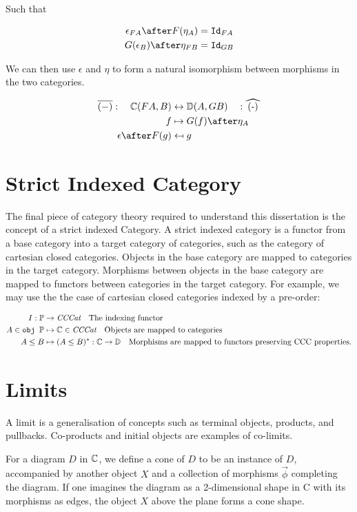 \documentclass{Report}
\begin{document}
Such that 

\begin{align}
    \epsilon_{F A}\after F(\eta_A) & = \Id{F A} \\
    G(\epsilon_B)\after \eta_{F B} & = \Id{G B}
\end{align}

We can then use $\epsilon$ and $\eta$ to form a natural isomorphism between morphisms in the two categories.

\begin{align}
    \bar{(-)}: \quad\C(FA, B) &\leftrightarrow \DC(A, GB) \quad: \widehat{(-)}\\
     f & \mapsto G(f)\after\eta_A \\
     \epsilon\after F(g) & \mapsfrom g\\
\end{align}

\section{Strict Indexed Category}
The final piece of category theory required to understand this dissertation is the concept of a strict indexed Category. A strict indexed category is a functor from a base category into a target category of categories, such as the category of cartesian closed categories. Objects in the base category are mapped to categories in the target category. Morphisms between objects in the base category are mapped to functors between categories in the target category. For example, we may use the the case of cartesian closed categories indexed by a pre-order:

\begin{align}
    I: \mathbb{P} & \rightarrow \textit{CCCat}\quad\text{The indexing functor} \\
    A \in\texttt{obj }\mathbb{P} & \mapsto \mathbb{C} \in\textit{CCCat}\quad\text{Objects are mapped to categories}\\
    A \leq B & \mapsto (A \leq B)^*: \mathbb{C} \rightarrow \mathbb{D}\quad\text{Morphisms are mapped to functors preserving CCC properties.}
\end{align}

\section{Limits}
A limit is a generalisation of concepts such as terminal objects, products, and pullbacks. Co-products and initial objects are examples of co-limits.


For a diagram $D$ in $\mathbb{C}$, we define a cone of $D$ to be an instance of $D$, accompanied by another object $X$ and a collection of morphisms $\vec{\phi}$ completing the diagram. If one imagines the diagram as a 2-dimensional shape in C with its morphisms as edges, the object $X$ above the plane forms a cone shape.
\end{document}
